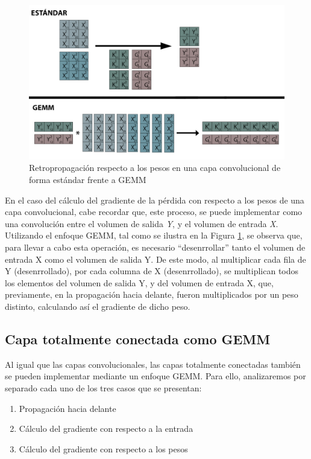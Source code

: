 \begin{figure}[H]
	\includegraphics[scale=0.33]{imagenes/conv_std_vs_gemm_backprop_pesos.jpg}  
	\caption{Retropropagación respecto a los pesos en una capa convolucional de forma estándar frente a GEMM}
	\label{fig:conv_std_vs_gemm_backprop_pesos}
\end{figure}

En el caso del cálculo del gradiente de la pérdida con respecto a los pesos de una capa convolucional, cabe recordar que, este proceso, se puede implementar como una convolución entre el volumen de salida \textit{Y}, y el volumen de entrada \textit{X}. Utilizando el enfoque GEMM, tal como se ilustra en la Figura \ref{fig:conv_std_vs_gemm_backprop_pesos}, se observa que, para llevar a cabo esta operación, es necesario ``desenrrollar'' tanto el volumen de entrada X como el volumen de salida Y. De este modo, al multiplicar cada fila de Y (desenrrollado), por cada columna de X (desenrrollado), se multiplican todos los elementos del volumen de salida Y, y del volumen de entrada X, que, previamente, en la propagación hacia delante, fueron multiplicados por un peso distinto, calculando así el gradiente de dicho peso.

\subsection{Capa totalmente conectada como GEMM \cite{nvidia_back_fully_GEMM}}

Al igual que las capas convolucionales, las capas totalmente conectadas también se pueden implementar mediante un enfoque GEMM. Para ello, analizaremos por separado cada uno de los tres casos que se presentan:
\begin{enumerate}[label=\textbullet, nosep]
	\item Propagación hacia delante
	\item Cálculo del gradiente con respecto a la entrada
	\item Cálculo del gradiente con respecto a los pesos
\end{enumerate}

